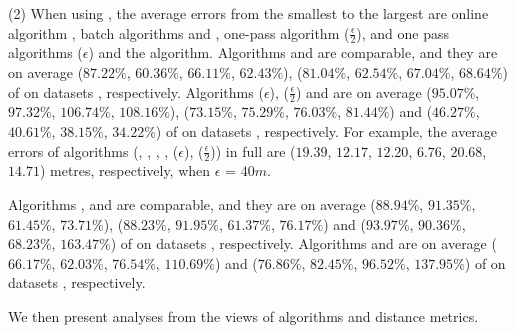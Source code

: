\sstab (2) When using \sed, the average errors from the smallest
to the largest are online algorithm \squishe, batch algorithms \tpa and \dpa,
one-pass algorithm \cised($\frac{\epsilon}{2}$), and one pass algorithms \cised(${\epsilon}$) and the \opt algorithm.
%
Algorithms \tpa and \dpa are comparable, and they are on average
{($87.22\%$, $60.36\%$, $66.11\%$, $62.43\%$), ($81.04\%$, $62.54\%$, $67.04\%$, $68.64\%$)} of \opt on datasets \dSets, respectively.
Algorithms \cised(${\epsilon}$), \cised($\frac{\epsilon}{2}$) and \squishe are on average {($95.07\%$, $97.32\%$, $106.74\%$, $108.16\%$), ($73.15\%$, $75.29\%$, $76.03\%$, $81.44\%$) and ($46.27\%$, $40.61\%$, $38.15\%$, $34.22\%$)} of \opt on datasets \dSets, respectively.
%
For example, the average errors of algorithms
(\opt, \tpa, \dpa, \squishe, \cised(${\epsilon}$), \cised($\frac{\epsilon}{2}$)) in full \mopsi are ($19.39$, $12.17$, $12.20$, $6.76$, $20.68$, $14.71$) metres, respectively, when $\epsilon$ = $40m$.
%


Algorithms \tpa, \opwa and \interval are comparable, and they are on average
{($88.94\%$, $91.35\%$, $61.45\%$, $73.71\%$), ($88.23\%$, $91.95\%$, $61.37\%$, $76.17\%$) and ($93.97\%$, $90.36\%$, $68.23\%$, $163.47\%$)} of \opt on datasets \dSets, respectively.
Algorithms \intersec and \dpa are on average ($66.17\%$, $62.03\%$, $76.54\%$, $110.69\%$) and ($76.86\%$, $82.45\%$, $96.52\%$, $137.95\%$) of \opt on datasets \dSets, respectively.


We then present analyses from the views of \lsa algorithms and distance metrics.

